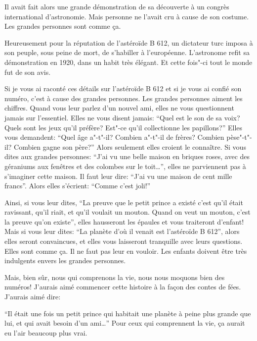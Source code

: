\begin{Parallel}[p]{}{}
{Il avait fait alors une grande
démonstration de sa découverte à un
congrès international d'astronomie. Mais personne
ne l'avait cru à cause de son costume. Les grandes
personnes sont comme ça.

Heureusement pour la réputation de l'astéroïde B 612, un dictateur turc imposa à son peuple, sous
peine de mort, de s'habiller à l'européenne. L'astronome refit sa démonstration en 1920, dans un habit
très élégant. Et cette fois"-ci tout le monde fut de son avis.

Si je vous ai raconté ces détails sur l'astéroïde B 612 et si je vous ai confié son numéro, c'est
à cause des grandes personnes. Les grandes personnes aiment les chiffres. Quand vous leur parlez
d'un nouvel ami, elles ne vous questionnent jamais
sur l'essentiel. Elles ne vous disent jamais: ``Quel
est le son de sa voix? Quels sont les jeux qu'il préfère? Est"-ce qu'il
collectionne les papillons?'' Elles vous demandent: ``Quel âge a"-t"-il? Combien a"-t"-il de frères? Combien pèse"-t"-il? Combien gagne son père?'' Alors seulement elles croient le connaître. Si
vous dites aux grandes personnes: ``J'ai vu une belle
maison en briques roses, avec des géraniums aux
fenêtres et des colombes sur le toit\ldots{}'', elles ne parviennent pas à s'imaginer cette maison. Il faut leur
dire: ``J'ai vu une maison de cent mille francs''.
Alors elles s'écrient: ``Comme c'est joli!''

Ainsi, si vous leur dites, ``La preuve que le petit
prince a existé c'est qu'il était ravissant, qu'il riait, et
qu'il voulait un mouton. Quand on veut un mouton,
c'est la preuve qu'on existe'', elles hausseront les
épaules et vous traiteront d'enfant! Mais si vous leur
dites: ``La planète d'où il venait est l'astéroïde B 
612'', alors elles seront convaincues, et elles vous
laisseront tranquille avec leurs questions. Elles sont
comme ça. Il ne faut pas leur en vouloir. Les enfants
doivent être très indulgents envers les grandes personnes.

Mais, bien sûr, nous qui comprenons la vie, nous
nous moquons bien des numéros! J'aurais aimé
commencer cette histoire à la façon des contes de
fées. J'aurais aimé dire:

``Il était une fois un petit prince qui habitait une
planète à peine plus grande que lui, et qui avait
besoin d'un ami\ldots{}'' Pour ceux qui comprennent la
vie, ça aurait eu l'air beaucoup plus vrai.

}
\end{Parallel}
